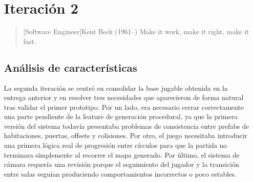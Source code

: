 \chapter{Iteración 2}

\begin{quotation}[Software Engineer]{Kent Beck (1961--)}
Make it work, make it right, make it fast.
\end{quotation}

\begin{abstract}
Esta iteración consolida el primer prototipo funcional y corrige carencias detectadas en
la entrega inicial. El trabajo se centra en completar aspectos pendientes de la generación
procedural, introducir la progresión entre círculos y estabilizar el sistema de cámara
por salas.
\end{abstract}

\section{Análisis de características}
La segunda iteración se centró en consolidar la base jugable obtenida en la entrega
anterior y en resolver tres necesidades que aparecieron de forma natural tras validar el
primer prototipo. Por un lado, era necesario cerrar correctamente una parte pendiente de la
feature de generación procedural, ya que la primera versión del sistema todavía presentaba
problemas de consistencia entre prefabs de habitaciones, puertas, offsets y colisiones. Por
otro, el juego necesitaba introducir una primera
lógica real de progresión entre círculos para que la partida no terminara simplemente al
recorrer el mapa generado. Por último, el sistema de cámara requería una revisión porque el
seguimiento del jugador y la transición entre salas seguían produciendo comportamientos
incorrectos o poco estables.

